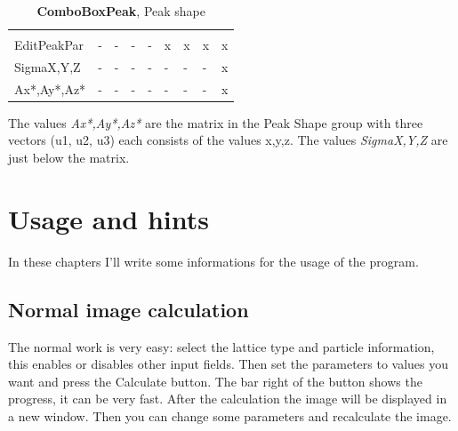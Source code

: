 \documentclass[11pt]{article} %
\begin{document}
\begin{longtable}{|L{3.2cm}|C{0.5cm}|C{0.5cm}|C{0.5cm}|C{0.5cm}|C{0.5cm}|C{0.5cm}|C{0.5cm}|C{0.5cm}|}
\caption{{\bf ComboBoxPeak}, Peak shape} \\
\hline{} &  &  &  &  &  &  &  &   \\
\endfirsthead
\hline{} &  &  &  &  &  &  &  &   \\
\endhead
\hline
EditPeakPar	& - & - & - & - & x & x & x & x  \\ \hline
SigmaX,Y,Z	& - & - & - & - & - & - & - & x  \\ \hline
Ax*,Ay*,Az*	& - & - & - & - & - & - & - & x  \\ \hline
 \hline
\end{longtable}
The values {\it Ax*,Ay*,Az*} are the matrix in the Peak Shape group with three vectors (u1, u2, u3) each consists of the values x,y,z. The values {\it SigmaX,Y,Z} are just below the matrix.

 

\clearpage
\section{Usage and hints}

In these chapters I'll write some informations for the usage of the program.

\subsection{Normal image calculation}

The normal work is very easy: select the lattice type and particle information, this enables or disables other input fields. Then set the parameters to values you want and press the Calculate button. The bar right of the button shows the progress, it can be very fast. After the calculation the image will be displayed in a new window. Then you can change some parameters and recalculate the image.
\end{document}
